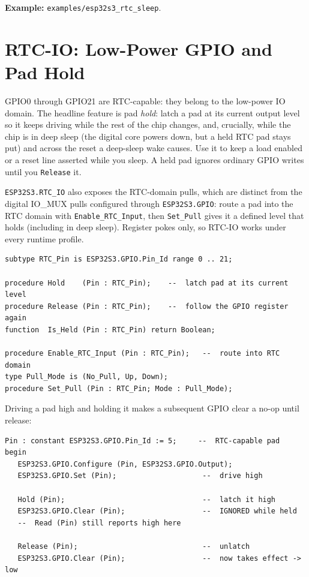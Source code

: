 \noindent\textbf{Example:} \texttt{examples/esp32s3\_rtc\_sleep}.

\section{RTC-IO: Low-Power GPIO and Pad Hold}
\label{app:int:rtcio}

GPIO0 through GPIO21 are RTC-capable: they belong to the low-power IO domain. The
headline feature is pad \emph{hold}: latch a pad at its current output level so
it keeps driving while the rest of the chip changes, and, crucially, while the
chip is in deep sleep (the digital core powers down, but a held RTC pad stays put)
and across the reset a deep-sleep wake causes. Use it to keep a load enabled or a
reset line asserted while you sleep. A held pad ignores ordinary GPIO writes until
you \texttt{Release} it.

\texttt{ESP32S3.RTC\_IO} also exposes the RTC-domain pulls, which are distinct
from the digital IO\_MUX pulls configured through \texttt{ESP32S3.GPIO}: route a
pad into the RTC domain with \texttt{Enable\_RTC\_Input}, then \texttt{Set\_Pull}
gives it a defined level that holds (including in deep sleep). Register pokes only,
so RTC-IO works under every runtime profile.

\begin{lstlisting}
subtype RTC_Pin is ESP32S3.GPIO.Pin_Id range 0 .. 21;

procedure Hold    (Pin : RTC_Pin);    --  latch pad at its current level
procedure Release (Pin : RTC_Pin);    --  follow the GPIO register again
function  Is_Held (Pin : RTC_Pin) return Boolean;

procedure Enable_RTC_Input (Pin : RTC_Pin);   --  route into RTC domain
type Pull_Mode is (No_Pull, Up, Down);
procedure Set_Pull (Pin : RTC_Pin; Mode : Pull_Mode);
\end{lstlisting}

Driving a pad high and holding it makes a subsequent GPIO clear a no-op until
release:

\begin{lstlisting}
Pin : constant ESP32S3.GPIO.Pin_Id := 5;     --  RTC-capable pad
begin
   ESP32S3.GPIO.Configure (Pin, ESP32S3.GPIO.Output);
   ESP32S3.GPIO.Set (Pin);                    --  drive high

   Hold (Pin);                                --  latch it high
   ESP32S3.GPIO.Clear (Pin);                  --  IGNORED while held
   --  Read (Pin) still reports high here

   Release (Pin);                             --  unlatch
   ESP32S3.GPIO.Clear (Pin);                  --  now takes effect -> low
\end{lstlisting}


